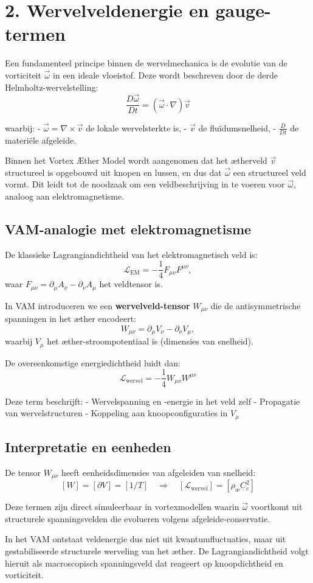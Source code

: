 \section*{2. Wervelveldenergie en gauge-termen}

Een fundamenteel principe binnen de wervelmechanica is de evolutie van de vorticiteit $\vec{\omega}$ in een ideale vloeistof. Deze wordt beschreven door de derde Helmholtz-wervelstelling:
\[
    \frac{D \vec{\omega}}{Dt} = (\vec{\omega} \cdot \nabla) \vec{v}
\]

waarbij:
- $\vec{\omega} = \nabla \times \vec{v}$ de lokale wervelsterkte is,
- $\vec{v}$ de fluïdumsnelheid,
- $\frac{D}{Dt}$ de materiële afgeleide.

Binnen het Vortex Æther Model wordt aangenomen dat het ætherveld $\vec{v}$ structureel is opgebouwd uit knopen en lussen, en dus dat $\vec{\omega}$ een structureel veld vormt. Dit leidt tot de noodzaak om een veldbeschrijving in te voeren voor $\vec{\omega}$, analoog aan elektromagnetisme.

\subsection*{VAM-analogie met elektromagnetisme}
De klassieke Lagrangiandichtheid van het elektromagnetisch veld is:
\[
    \mathcal{L}_\text{EM} = -\frac{1}{4} F_{\mu\nu} F^{\mu\nu},
\]
waar $F_{\mu\nu} = \partial_\mu A_\nu - \partial_\nu A_\mu$ het veldtensor is.

In VAM introduceren we een \textbf{wervelveld-tensor} $W_{\mu\nu}$ die de antisymmetrische spanningen in het æther encodeert:
\[
    W_{\mu\nu} = \partial_\mu V_\nu - \partial_\nu V_\mu,
\]
waarbij $V_\mu$ het æther-stroompotentiaal is (dimensies van snelheid).

De overeenkomstige energiedichtheid luidt dan:
\[
    \mathcal{L}_\text{wervel} = -\frac{1}{4} W_{\mu\nu} W^{\mu\nu}
\]

Deze term beschrijft:
- Wervelspanning en -energie in het veld zelf
- Propagatie van wervelstructuren
- Koppeling aan knoopconfiguraties in $V_\mu$

\subsection*{Interpretatie en eenheden}
De tensor $W_{\mu\nu}$ heeft eenheidsdimensies van afgeleiden van snelheid:
\[
    [W] = [\partial V] = [1/T] \quad \Rightarrow \quad [\mathcal{L}_\text{wervel}] = [\rho_\text{\ae} C_e^2]
\]

Deze termen zijn direct simuleerbaar in vortexmodellen waarin $\vec{\omega}$ voortkomt uit structurele spanningsvelden die evolueren volgens afgeleide-conservatie.

In het VAM ontstaat veldenergie dus niet uit kwantumfluctuaties, maar uit gestabiliseerde structurele werveling van het æther. De Lagrangiandichtheid volgt hieruit als macroscopisch spanningsveld dat reageert op knoopdichtheid en vorticiteit.
